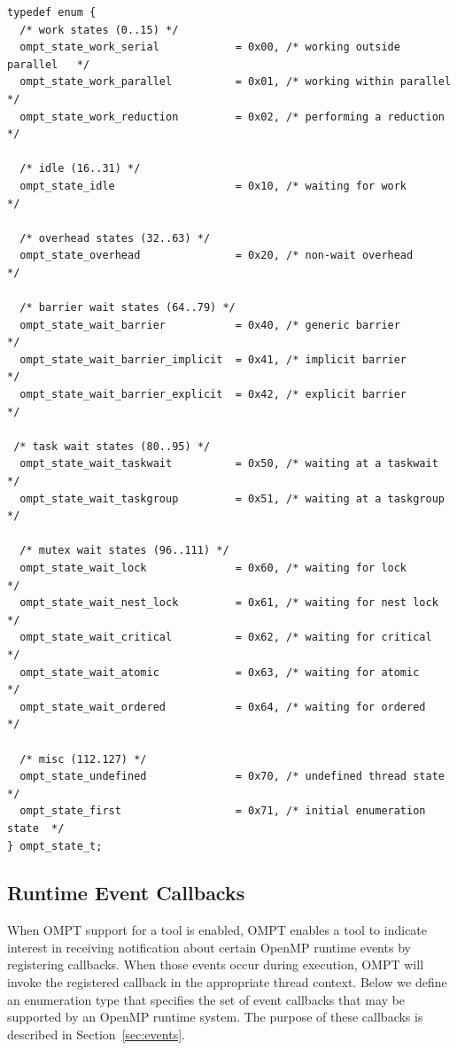 \documentclass{article}
\begin{document}
\begin{verbatim}
typedef enum {
  /* work states (0..15) */
  ompt_state_work_serial            = 0x00, /* working outside parallel   */
  ompt_state_work_parallel          = 0x01, /* working within parallel    */
  ompt_state_work_reduction         = 0x02, /* performing a reduction     */

  /* idle (16..31) */
  ompt_state_idle                   = 0x10, /* waiting for work           */

  /* overhead states (32..63) */
  ompt_state_overhead               = 0x20, /* non-wait overhead          */

  /* barrier wait states (64..79) */
  ompt_state_wait_barrier           = 0x40, /* generic barrier            */
  ompt_state_wait_barrier_implicit  = 0x41, /* implicit barrier           */
  ompt_state_wait_barrier_explicit  = 0x42, /* explicit barrier           */
    
 /* task wait states (80..95) */
  ompt_state_wait_taskwait          = 0x50, /* waiting at a taskwait      */
  ompt_state_wait_taskgroup         = 0x51, /* waiting at a taskgroup     */
	
  /* mutex wait states (96..111) */	      	    
  ompt_state_wait_lock              = 0x60, /* waiting for lock           */
  ompt_state_wait_nest_lock         = 0x61, /* waiting for nest lock      */
  ompt_state_wait_critical          = 0x62, /* waiting for critical       */
  ompt_state_wait_atomic            = 0x63, /* waiting for atomic         */
  ompt_state_wait_ordered           = 0x64, /* waiting for ordered        */

  /* misc (112.127) */
  ompt_state_undefined              = 0x70, /* undefined thread state     */
  ompt_state_first                  = 0x71, /* initial enumeration state  */
} ompt_state_t;
\end{verbatim}
\clearpage
\subsection{Runtime Event Callbacks}
\label{appendix:ompt-types:events}

When OMPT support for a tool is enabled, 
OMPT enables a tool to indicate interest in receiving notification about certain OpenMP runtime events by registering callbacks. When those events occur during execution, OMPT will invoke the registered callback in the appropriate thread context.
Below we define an enumeration type that specifies the set of event callbacks that may be supported by an OpenMP runtime system. 
The purpose of these callbacks is described in Section~\ref{sec:events}. 
\end{document}
